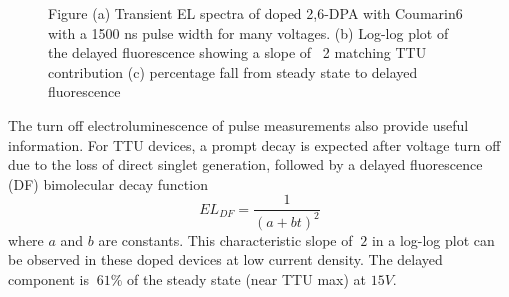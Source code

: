 \documentclass[
  letterpaper,
  DIV=11,
  numbers=noendperiod,
  oneside]{scrreprt}
\begin{document}
\begin{figure}
\begin{minipage}[t]{0.50\linewidth}
{{}

}

\subcaption{\label{fig-cfitslope}}
\end{minipage}%
\newline
\begin{minipage}[t]{\linewidth}

{\centering 


}

\subcaption{\label{fig-cslopedata}}
\end{minipage}%

\caption{\label{fig-cslope}Figure (a) Transient EL spectra of doped
2,6-DPA with Coumarin6 with a 1500 ns pulse width for many voltages. (b)
Log-log plot of the delayed fluorescence showing a slope of ~2 matching
TTU contribution (c) percentage fall from steady state to delayed
fluorescence}

\end{figure}

The turn off electroluminescence of pulse measurements also provide
useful information. For TTU devices, a prompt decay is expected after
voltage turn off due to the loss of direct singlet generation, followed
by a delayed fluorescence (DF) bimolecular decay function
\[EL_{DF} = \frac{1}{(a+bt)^2}\] where \(a\) and \(b\) are constants.
This characteristic slope of \(~2\) in a log-log plot can be observed in
these doped devices at low current density. The delayed component is
\(~61\%\) of the steady state (near TTU max) at \(15V\).
\end{document}
